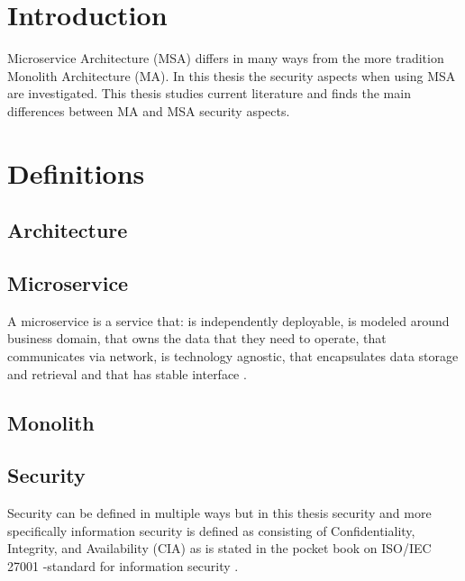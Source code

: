 


\section{Introduction}

Microservice Architecture (MSA) differs in many ways from 
the more tradition Monolith Architecture (MA).
In this thesis the security aspects when using MSA are investigated. 
This thesis studies current literature and finds the main differences between
MA and MSA security aspects.





\section{Definitions}

\subsection{Architecture}




\subsection{Microservice}

A microservice is a service that: is independently deployable,
is modeled around business domain,
that owns the data that they need to operate,
that communicates via network,
is technology agnostic,
that encapsulates data storage and retrieval and 
that has stable interface \citep{newman2019}.

\subsection{Monolith}


\subsection{Security}

Security can be defined in multiple ways but in this thesis security 
and more specifically information security is defined as consisting of 
Confidentiality, Integrity, and Availability (CIA) as is stated in the 
pocket book on ISO/IEC 27001 -standard for information security \citep{isoiec27001}.

